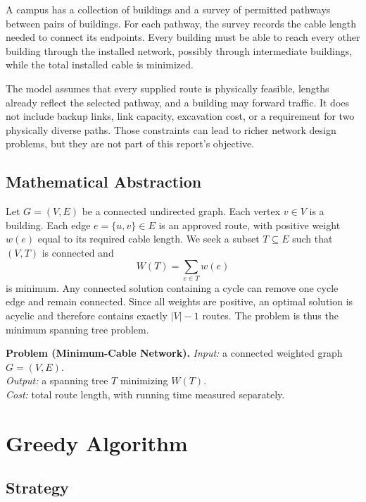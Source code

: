 \documentclass[conference]{IEEEtran}
\begin{document}
A campus has a collection of buildings and a survey of permitted pathways
between pairs of buildings. For each pathway, the survey records the cable
length needed to connect its endpoints. Every building must be able to reach
every other building through the installed network, possibly through
intermediate buildings, while the total installed cable is minimized.

The model assumes that every supplied route is physically feasible, lengths
already reflect the selected pathway, and a building may forward traffic. It
does not include backup links, link capacity, excavation cost, or a requirement
for two physically diverse paths. Those constraints can lead to richer network
design problems, but they are not part of this report's objective.

\subsection{Mathematical Abstraction}

Let $G=(V,E)$ be a connected undirected graph. Each vertex $v\in V$ is a
building. Each edge $e=\{u,v\}\in E$ is an approved route, with positive
weight $w(e)$ equal to its required cable length. We seek a subset $T\subseteq
E$ such that $(V,T)$ is connected and
\begin{equation}
  W(T)=\sum_{e\in T} w(e)
\end{equation}
is minimum. Any connected solution containing a cycle can remove one cycle
edge and remain connected. Since all weights are positive, an optimal solution
is acyclic and therefore contains exactly $|V|-1$ routes. The problem is thus
the minimum spanning tree problem.

\medskip
\noindent\textbf{Problem (Minimum-Cable Network).}
\emph{Input:} a connected weighted graph $G=(V,E)$.\\
\emph{Output:} a spanning tree $T$ minimizing $W(T)$.\\
\emph{Cost:} total route length, with running time measured separately.

\section{Greedy Algorithm}

\subsection{Strategy}
\end{document}
